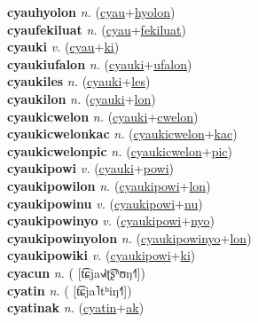 \textbf{cyauhyolon} \textit{n.} (\hyperref[cyau]{cyau}+\hyperref[hyolon]{hyolon})
 \label{cyauhyolon} \\
\textbf{cyaufekiluat} \textit{n.} (\hyperref[cyau]{cyau}+\hyperref[fekiluat]{fekiluat})
 \label{cyaufekiluat} \\
\textbf{cyauki} \textit{v.} (\hyperref[cyau]{cyau}+\hyperref[ki]{ki})
 \label{cyauki} \\
\textbf{cyaukiufalon} \textit{n.} (\hyperref[cyauki]{cyauki}+\hyperref[ufalon]{ufalon})
 \label{cyaukiufalon} \\
\textbf{cyaukiles} \textit{n.} (\hyperref[cyauki]{cyauki}+\hyperref[les]{les})
 \label{cyaukiles} \\
\textbf{cyaukilon} \textit{n.} (\hyperref[cyauki]{cyauki}+\hyperref[lon]{lon})
 \label{cyaukilon} \\
\textbf{cyaukicwelon} \textit{n.} (\hyperref[cyauki]{cyauki}+\hyperref[cwelon]{cwelon})
 \label{cyaukicwelon} \\
\textbf{cyaukicwelonkac} \textit{n.} (\hyperref[cyaukicwelon]{cyaukicwelon}+\hyperref[kac]{kac})
 \label{cyaukicwelonkac} \\
\textbf{cyaukicwelonpic} \textit{n.} (\hyperref[cyaukicwelon]{cyaukicwelon}+\hyperref[pic]{pic})
 \label{cyaukicwelonpic} \\
\textbf{cyaukipowi} \textit{v.} (\hyperref[cyauki]{cyauki}+\hyperref[powi]{powi})
 \label{cyaukipowi} \\
\textbf{cyaukipowilon} \textit{n.} (\hyperref[cyaukipowi]{cyaukipowi}+\hyperref[lon]{lon})
 \label{cyaukipowilon} \\
\textbf{cyaukipowinu} \textit{v.} (\hyperref[cyaukipowi]{cyaukipowi}+\hyperref[nu]{nu})
 \label{cyaukipowinu} \\
\textbf{cyaukipowinyo} \textit{v.} (\hyperref[cyaukipowi]{cyaukipowi}+\hyperref[nyo]{nyo})
 \label{cyaukipowinyo} \\
\textbf{cyaukipowinyolon} \textit{n.} (\hyperref[cyaukipowinyo]{cyaukipowinyo}+\hyperref[lon]{lon})
 \label{cyaukipowinyolon} \\
\textbf{cyaukipowiki} \textit{v.} (\hyperref[cyaukipowi]{cyaukipowi}+\hyperref[ki]{ki})
 \label{cyaukipowiki} \\
\textbf{cyacun} \textit{n.} ( [t͡ɕja˧˩˧ʈ͡ʂʰʊŋ˧˥])
 \label{cyacun} \\
\textbf{cyatin} \textit{n.} ( [t͡ɕja˥tʰiŋ˧˥])
 \label{cyatin} \\
\textbf{cyatinak} \textit{n.} (\hyperref[cyatin]{cyatin}+\hyperref[ak]{ak})
 \label{cyatinak} \\

